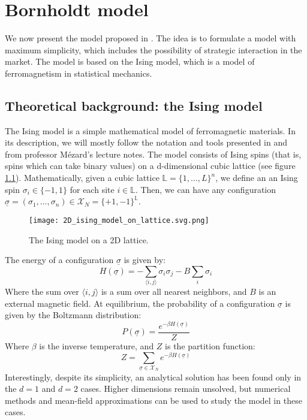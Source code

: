 \chapter{Bornholdt model}\label{ch:chapter2}
We now present the model proposed in \cite{bornholdt}. The idea is to formulate a model with maximum simplicity, which includes the possibility of strategic interaction in the market. The model is based on the Ising model, which is a model of ferromagnetism in statistical mechanics.

\section{Theoretical background: the Ising model}
The Ising model is a simple mathematical model of ferromagnetic materials. In its description, we will mostly follow the notation and tools presented in \cite{mezard_book} and from professor Mézard's lecture notes. The model consists of Ising spins (that is, spins which can take binary values) on a d-dimensional cubic lattice (see figure \ref{fig:ising_model}). Mathematically, given a cubic lattice $\mathbb{L}=\{1,\dots,L\}^n$, we define an an Ising spin $\sigma_i\in\{-1,1\}$ for each site $i\in\mathbb{L}$. Then, we can have any configuration $\underline{\sigma} = (\sigma_1,\dots,\sigma_n) \in \mathcal{X}_N=\{+1,-1\}^{\mathbb{L}}$.

\begin{figure}[h]
    \centering
    \texttt{[image: 2D\_ising\_model\_on\_lattice.svg.png]}
    \caption{The Ising model on a 2D lattice.}
    \label{fig:ising_model}
\end{figure}


The energy of a configuration $\underline{\sigma}$ is given by:
\begin{equation}
    H(\underline{\sigma}) = -\sum_{\langle i,j\rangle}\sigma_i\sigma_j - B\sum_i \sigma_i
\end{equation}
Where the sum over $\langle i,j\rangle$ is a sum over all nearest neighbors, and $B$ is an external magnetic field. At equilibrium, the probability of a configuration $\underline{\sigma}$ is given by the Boltzmann distribution:
\begin{equation}
    P(\underline{\sigma}) = \frac{e^{-\beta H(\underline{\sigma})}}{Z}
\end{equation}
Where $\beta$ is the inverse temperature, and $Z$ is the partition function:
\begin{equation}
    Z = \sum_{\underline{\sigma}\in\mathcal{X}_N}e^{-\beta H(\underline{\sigma})}
\end{equation}
Interestingly, despite its simplicity, an analytical solution has been found only in the $d=1$ and $d=2$ cases. Higher dimensions remain unsolved, but numerical methods and mean-field approximations can be used to study the model in these cases.

